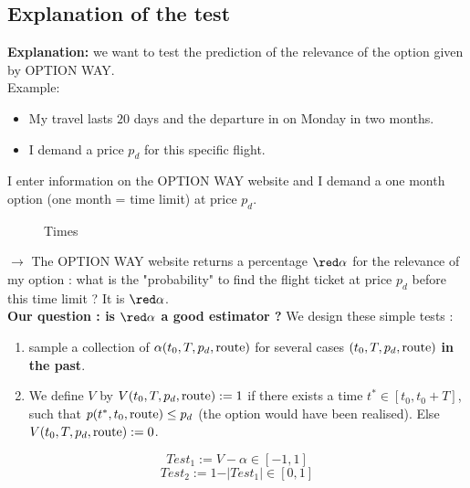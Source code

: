 \documentclass{beamer}
\begin{document}
\subsection{Explanation of the test}
\frame 
{ 
\textbf{Explanation:} we want to test the prediction of the relevance of the option given by OPTION WAY. \\
Example: 
\begin{itemize} 
\item My travel lasts $20$ days and the departure in on Monday in two months. 
\item I demand a price $p_d$ for this specific flight.  
\end{itemize}
I enter information on the OPTION WAY website and I demand a one month option (one month = time limit) at price $p_d$. \\
 \begin{figure}
\begin{center}
\caption{Times}
 \label{fig:contour}
 \end{center}
\end{figure}
}
\frame
{
$\to$ The OPTION WAY website returns a percentage $\red \alpha$  for the relevance of my option : what is the "probability" to find the flight ticket at price $p_d$ before this time limit ? It is $\red \alpha$. \\
\textbf{Our question : is $\red \alpha$ a good estimator ?}
We design these simple tests :
\begin{enumerate}
\item sample a collection of $\alpha(t_0,T,p_d, {\rm route})$ for several cases $(t_0,T,p_d, {\rm route})$ \textbf{in the past}. 
\item We define $V$ by $V(t_0,T,p_d,{\rm route}):=1$ if there exists a time $t^*\in [t_0,t_0+T]$, such that $p(t^*,t_0,{\rm route})\leq p_d$ (the option would have been realised).
Else $V(t_0,T,p_d,{\rm route}):=0$.
\end{enumerate}
$$\boxed{Test_1:=V-\alpha} \in [-1,1] $$
$$\boxed{Test_2:=1-\vert Test_1\vert}\in [0,1]$$
}
\end{document}
